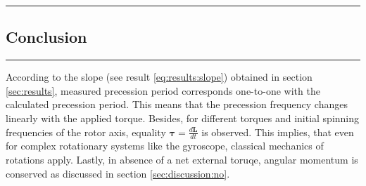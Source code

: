 {\color{gray}\hrule}
\begin{center}
\section{Conclusion}
\bigskip
\end{center}
{\color{gray}\hrule}

\begin{multicols}{2}
  According to the slope (see result \ref{eq:results:slope}) obtained in section \ref{sec:results}, measured precession period corresponds one-to-one with the calculated precession period. This means that the precession frequency changes linearly with the applied torque. Besides, for different torques and initial spinning frequencies of the rotor axis, equality $\boldsymbol\tau = \frac{d\mathbf{L}}{dt}$ is observed. This implies, that even for complex rotationary systems like the gyroscope, classical mechanics of rotations apply. Lastly, in absence of a net external toruqe, angular momentum is conserved as discussed in section \ref{sec:discussion:no}.
\end{multicols}
